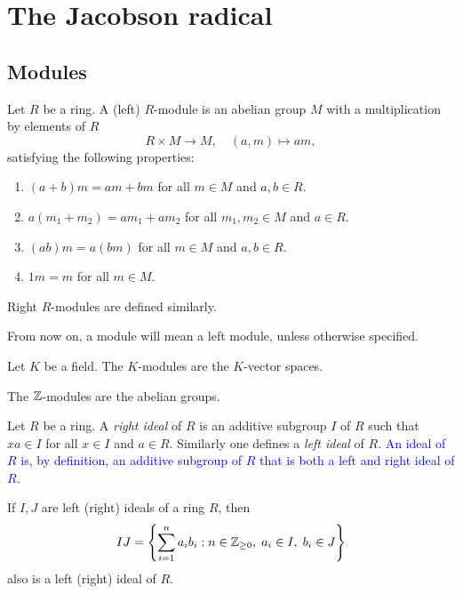 \chapter{The Jacobson radical}
\label{radical}

\section*{Modules}

Let $R$ be a ring. A (left) $R$-module is an abelian group $M$ with a multiplication by elements of $R$
\[
R\times M\to M,\quad
(a,m)\mapsto am,
\]
satisfying the following properties:
\begin{enumerate}
	\item $(a+b)m=am+bm$ for all $m\in M$ and $a,b\in R$. 
    \item $a(m_1+m_2)=am_1+am_2$ for all $m_1,m_2\in M$ and $a\in R$.
    \item $(ab)m=a(bm)$ for all $m\in M$ and $a,b\in R$.
    \item $1m=m$ for all $m\in M$.
\end{enumerate}

Right $R$-modules are defined similarly.

\begin{convention}
From now on, a module will mean a left module, unless otherwise specified. 
\end{convention}

\begin{example}
	Let $K$ be a field. The  $K$-modules are the $K$-vector spaces.
\end{example}

\begin{example}
    The $\mathbb{Z}$-modules are the abelian groups.
\end{example}

Let $R$ be a ring. A {\em right ideal} of $R$ is an additive subgroup $I$ of $R$ such that $xa\in I$ for all $x\in I$ and $a\in R$.
Similarly one defines a {\em left ideal} 
of $R$. \textcolor{blue}{An ideal of $R$ is, by definition, an additive subgroup of $R$ that is
both a left and right ideal of $R$.}

If $I,J$ are left (right) ideals of a ring $R$, then
\[
IJ=\left\{\sum_{i=1}^{n} a_ib_i:n\in\mathbb{Z}_{\geq0},\; a_i\in I,\; b_i\in J\right\}
\]
also is a left (right) ideal of $R$.

